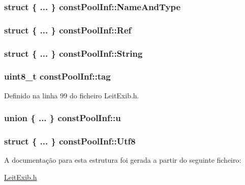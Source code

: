 \hypertarget{structconst_pool_inf_addb54edaecbb6a09ef4799c98134332a}{
\subsubsection[{Name\-And\-Type}]{\setlength{\rightskip}{0pt plus 5cm}struct \{ ... \}   const\-Pool\-Inf\-::\-Name\-And\-Type}}\label{structconst_pool_inf_addb54edaecbb6a09ef4799c98134332a}
\hypertarget{structconst_pool_inf_ad0c502e47bccc75b8e939e5ccd1a8a16}{
\subsubsection[{Ref}]{\setlength{\rightskip}{0pt plus 5cm}struct \{ ... \}   const\-Pool\-Inf\-::\-Ref}}\label{structconst_pool_inf_ad0c502e47bccc75b8e939e5ccd1a8a16}
\hypertarget{structconst_pool_inf_adfd1e8831065142d9deb97e7bd79c356}{
\subsubsection[{String}]{\setlength{\rightskip}{0pt plus 5cm}struct \{ ... \}   const\-Pool\-Inf\-::\-String}}\label{structconst_pool_inf_adfd1e8831065142d9deb97e7bd79c356}
\hypertarget{structconst_pool_inf_a6ea639ac2bd081a75fb00ee2231b5bf3}{
\subsubsection[{tag}]{\setlength{\rightskip}{0pt plus 5cm}uint8\-\_\-t const\-Pool\-Inf\-::tag}}\label{structconst_pool_inf_a6ea639ac2bd081a75fb00ee2231b5bf3}


Definido na linha 99 do ficheiro Leit\-Exib.\-h.

\hypertarget{structconst_pool_inf_ad39a609c73e52b6faa7d2f1a29a14d28}{
\subsubsection[{u}]{\setlength{\rightskip}{0pt plus 5cm}union \{ ... \}   const\-Pool\-Inf\-::u}}\label{structconst_pool_inf_ad39a609c73e52b6faa7d2f1a29a14d28}
\hypertarget{structconst_pool_inf_abf7874c7fbecc53ed38466b1ff897746}{
\subsubsection[{Utf8}]{\setlength{\rightskip}{0pt plus 5cm}struct \{ ... \}   const\-Pool\-Inf\-::\-Utf8}}\label{structconst_pool_inf_abf7874c7fbecc53ed38466b1ff897746}


A documentação para esta estrutura foi gerada a partir do seguinte ficheiro\-:\begin{DoxyCompactItemize}
\item 
\hyperlink{_leit_exib_8h}{Leit\-Exib.\-h}\end{DoxyCompactItemize}
